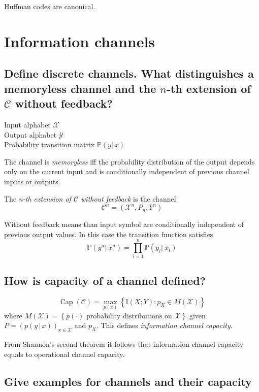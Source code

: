 \documentclass[a4paper]{article}
\newcommand\op[2][P]{\mathbb{#1}\left(#2\right)}
\newcommand\cond[3][P]{\mathbb{#1}\left(#2 \left|\:#3\right)\right.}
\newcommand\set[1]{\left\{#1\right\}}
\newcommand\key[1]{\textit{#1}}
\DeclareMathOperator{\Capacity}{Cap}
\theoremstyle{definition}
\begin{document}
Huffman codes are canonical.

\section{Information channels}

\subsection{Define discrete channels. What distinguishes a memoryless channel and the $n$-th extension of $\mathcal{C}$ without feedback?}

Input alphabet $\mathcal X$ \\
Output alphabet $\mathcal Y$ \\
Probability transition matrix $\cond yx$

The channel is \key{memoryless} iff the probability distribution of the output depends only on the current input and is conditionally independent of previous channel inputs or outputs.


The \key{n-th extension of $\mathcal{C}$ without feedback} is the channel
\[ \mathcal{C}^n = (\mathcal{X}^n, P_n, Y^n) \]

Without feedback means than input symbol are conditionally independent of previous output values.
In this case the transition function satisfies
\[ \cond{y^n}{x^n} = \prod_{i=1}^n \cond{y_i}{x_i} \]

\subsection{How is capacity of a channel defined?}

\[ \Capacity(\mathcal C) = \max_{p(x)}\set{\op[I]{X;Y}: p_X \in M(\mathcal{X})} \]
where $M(\mathcal{X}) = \set{p(\cdot) \text{ probability distributions on } \mathcal{X}}$
given $P = (p(y\,|\,x))_{x\in\mathcal{X}}$ and $p_X$. This defines \key{information channel capacity}.

From Shannon's second theorem it follows that information channel capacity equals to operational channel capacity.

\subsection{Give examples for channels and their capacity}
\end{document}
